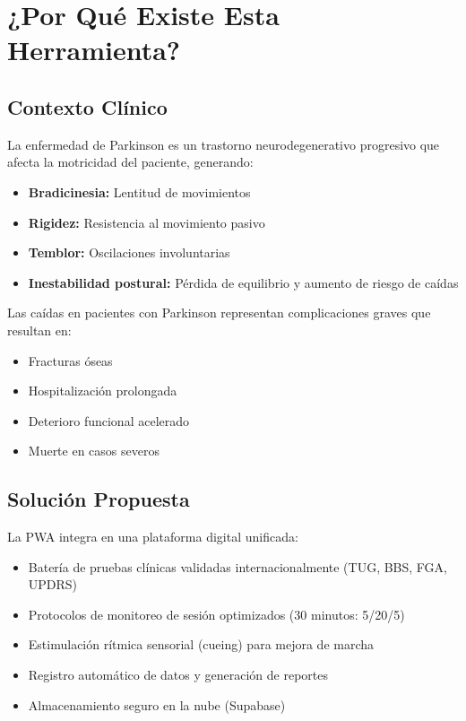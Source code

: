 \documentclass[12pt,a4paper,spanish,oneside]{book}
\begin{document}
\section{¿Por Qué Existe Esta Herramienta?}

\subsection{Contexto Clínico}

La enfermedad de Parkinson es un trastorno neurodegenerativo progresivo que afecta la motricidad del paciente, generando:

\begin{itemize}
  \item \textbf{Bradicinesia:} Lentitud de movimientos
  \item \textbf{Rigidez:} Resistencia al movimiento pasivo
  \item \textbf{Temblor:} Oscilaciones involuntarias
  \item \textbf{Inestabilidad postural:} Pérdida de equilibrio y aumento de riesgo de caídas
\end{itemize}

Las caídas en pacientes con Parkinson representan complicaciones graves que resultan en:
\begin{itemize}
  \item Fracturas óseas
  \item Hospitalización prolongada
  \item Deterioro funcional acelerado
  \item Muerte en casos severos
\end{itemize}

\subsection{Solución Propuesta}

La PWA integra en una plataforma digital unificada:
\begin{itemize}
  \item Batería de pruebas clínicas validadas internacionalmente (TUG, BBS, FGA, UPDRS)
  \item Protocolos de monitoreo de sesión optimizados (30 minutos: 5/20/5)
  \item Estimulación rítmica sensorial (cueing) para mejora de marcha
  \item Registro automático de datos y generación de reportes
  \item Almacenamiento seguro en la nube (Supabase)
\end{itemize}
\end{document}
